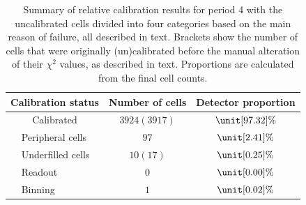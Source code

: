 \begin{table}[!hbtp]
\centering
\caption[Summary of relative calibration results for period 4]{Summary of relative calibration results for period 4 with the uncalibrated cells divided into four categories based on the main reason of failure, all described in text. Brackets show the number of cells that were originally (un)calibrated before the manual alteration of their $\chi^2$ values, as described in text. Proportions are calculated from the final cell counts.}
\def\arraystretch{1.4}
\begin{tabular}{|cl|c|c|}
\hline
\multicolumn{2}{|c|}{\textbf{Calibration status}} & \textbf{Number of cells} & \textbf{Detector proportion}\\\hline
\multicolumn{2}{|c|}{Calibrated} & $3924 (3917)$ & $\unit[97.32]{\%}$\\\hline
\parbox[t]{2mm}{} & Peripheral cells & $97$ & $\unit[2.41]{\%}$\\
 & Underfilled cells & $10 (17)$ & $\unit[0.25]{\%}$\\
 & Readout & $0$ & $\unit[0.00]{\%}$\\
 & Binning & $1$ & $\unit[0.02]{\%}$\\\hline
\end{tabular}
\label{tab:TestBeamPeriod4RelCalibResults}
\end{table}

